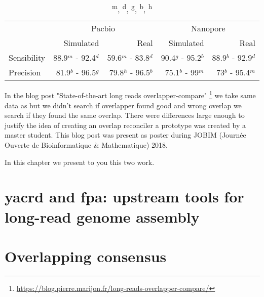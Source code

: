 \documentclass[main.tex]{subfiles}
\begin{document}
\begin{table}[ht]
    \centering
    \begin{tabular}{l|rr|rr}
                & \multicolumn{2}{c}{Pacbio}                & \multicolumn{2}{c}{Nanopore}              \\ 
                & Simulated           & Real                & Simulated         & Real                  \\ \hline
    Sensibility & 88.9$^m$ - 92.4$^d$ & 59.6$^m$ - 83.8$^d$ & 90.4$^g$ - 95.2$^b$ & 88.9$^b$ - 92.9$^d$ \\
    Precision   & 81.9$^b$ - 96.5$^g$ & 79.8$^h$ - 96.5$^b$ & 75.1$^b$ - 99$^m$   & 73$^b$ - 95.4$^m$   \\
    \end{tabular}
    \caption{\textsuperscript{m}, \textsuperscript{d}, \textsuperscript{g}, \textsuperscript{b}, \textsuperscript{h}\mhap}
    \label{preassembly:tab:ovl_result}
\end{table}

In the blog post "State-of-the-art long reads overlapper-compare" \footnote{\url{https://blog.pierre.marijon.fr/long-reads-overlapper-compare/}} we take same data as \cite{ovl_bench} but we didn't search if overlapper found good and wrong overlap we search if they found the same overlap. There were differences large enough to justify the idea of creating an overlap reconciler a prototype was created by a master student. 
This blog post was present as poster during JOBIM (Journée Ouverte de Bioinformatique \& Mathematique) 2018.


In this chapter we present to you this two work.

\section{yacrd and fpa: upstream tools for long-read genome assembly}




\section{Overlapping consensus}

\end{document}
